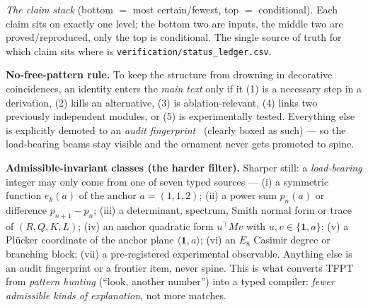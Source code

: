 \documentclass[11pt,a4paper]{article}
\newcommand{\cthree}{c_3}
\newcommand{\gcar}{g_{\mathrm{car}}}
\newcommand{\ainv}{\alpha^{-1}}
\begin{document}
\begin{center}
\end{center}
\noindent\emph{The claim stack} (bottom $=$ most certain/fewest, top $=$ conditional). Each claim sits on
exactly one level; the bottom two are inputs, the middle two are proved/reproduced, only the top is
conditional. The single source of truth for which claim sits where is
\texttt{verification/status\_ledger.csv}.

\smallskip
\noindent\textbf{No-free-pattern rule.} To keep the structure from drowning in decorative coincidences, an
identity enters the \emph{main text} only if it (1) is a necessary step in a derivation, (2) kills an
alternative, (3) is ablation-relevant, (4) links two previously independent modules, or (5) is
experimentally tested. Everything else is explicitly demoted to an \emph{audit fingerprint} \mE\ (clearly
boxed as such) --- so the load-bearing beams stay visible and the ornament never gets promoted to spine.

\noindent\textbf{Admissible-invariant classes (the harder filter).} Sharper still: a \emph{load-bearing}
integer may only come from one of seven typed sources --- (i) a symmetric function $e_k(a)$ of the anchor
$a=(1,1,2)$; (ii) a power sum $p_n(a)$ or difference $p_{n+1}{-}p_n$; (iii) a determinant, spectrum, Smith
normal form or trace of $(R,Q,K,L)$; (iv) an anchor quadratic form $u^\top M v$ with $u,v\in\{\mathbf1,a\}$;
(v) a Pl\"ucker coordinate of the anchor plane $\langle\mathbf1,a\rangle$; (vi) an $E_8$ Casimir degree or
branching block; (vii) a pre-registered experimental observable. Anything else is an audit fingerprint or a
frontier item, never spine. This is what converts TFPT from \emph{pattern hunting} (``look, another number'')
into a typed compiler: \emph{fewer admissible kinds of explanation}, not more matches.
\end{document}
